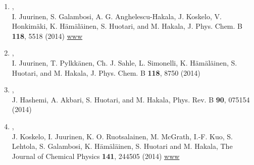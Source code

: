 \documentclass[12pt,a4]{report}
\begin{document}
\begin{enumerate}
\item{},\\
I. Juurinen, S. Galambosi, A. G. Anghelescu-Hakala, J. Koskelo, V. Honkim{\"a}ki, K. H{\"a}m{\"a}l{\"a}inen, S. Huotari, and M. Hakala, J. Phys. Chem. B {\bf 118}, 5518 (2014)
\href{http://pubs.acs.org/doi/full/10.1021/jp501913p}{www}
% 

\item{},\\
I. Juurinen, T. Pylkk{\"a}nen, Ch. J. Sahle, L. Simonelli, K. H{\"a}m{\"a}l{\"a}inen, S. Huotari, and M. Hakala, J. Phys. Chem. B {\bf 118}, 8750 (2014)

\item{},\\ 
J. Hashemi, A. Akbari, S. Huotari, and M. Hakala, Phys. Rev. B {\bf 90}, 075154 (2014) %

\item{},\\ 
J. Koskelo, I. Juurinen, K. O. Ruotsalainen, M. McGrath, I.-F. Kuo, S. Lehtola, S. Galambosi, K. H{\"a}m{\"a}l{\"a}inen, S. Huotari and M. Hakala, The Journal of Chemical Physics {\bf 141}, 244505 (2014) 
\href{http://dx.doi.org/10.1063/1.4904278}{www} 



\end{enumerate}
\end{document}
